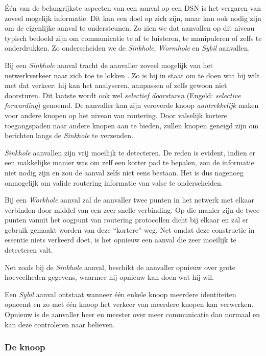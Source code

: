 \'E\'en van de belangrijkste aspecten van een aanval op een DSN is het vergaren
van zoveel mogelijk informatie. Dit kan een doel op zich zijn, maar kan ook
nodig zijn om de eigenlijke aanval te ondersteunen. Zo zien we dat aanvallen op
dit niveau typisch bedoeld zijn om communicatie te af te luisteren, te
manipuleren of zelfs te onderdrukken. Zo onderscheiden we de \emph{Sinkhole},
\emph{Wormhole} en \emph{Sybil} aanvallen.

Bij een \emph{Sinkhole} aanval tracht de aanvaller zoveel mogelijk van het
netwerkverkeer naar zich toe te lokken \citep{krontiris2008launching}. Zo is hij
in staat om te doen wat hij wilt met dat verkeer: hij kan het analyseren,
aanpassen of zelfs gewoon niet doorsturen. Dit laatste wordt ook wel
\emph{selectief doorsturen} (Engeld: \emph{selective forwarding}) genoemd. De
aanvaller kan zijn veroverde knoop \emph{aantrekkelijk} maken voor andere
knopen op het niveau van routering. Door valselijk kortere toegangspaden naar
andere knopen aan te bieden, zullen knopen geneigd zijn om berichten langs de
\emph{Sinkhole} te verzenden.

\emph{Sinkhole} aanvallen zijn vrij moeilijk te detecteren. De reden is
evident, indien er een makkelijke manier was om zelf een korter pad te bepalen,
zou de informatie niet nodig zijn en zou de aanval zelfs niet eens bestaan. Het
is dus nagenoeg onmogelijk om valide routering informatie van valse te
onderscheiden.

Bij een \emph{Workhole} aanval zal de aanvaller twee punten in het netwerk met
elkaar verbinden door middel van een zeer snelle verbinding. Op die manier zijn
de twee punten vanuit het oogpunt van routering protocollen dicht bij elkaar en
zal er gebruik gemaakt worden van deze ``kortere'' weg. Net omdat deze
constructie in essentie niets verkeerd doet, is het opnieuw een aanval die zeer
moeilijk te detecteren valt.

Net zoals bij de \emph{Sinkhole} aanval, beschikt de aanvaller opnieuw over
grote hoeveelheden gegevens, waarmee hij opnieuw kan doen wat hij wil.

Een \emph{Sybil} aanval ontstaat wanneer \'e\'en enkele knoop meerdere
identiteiten opneemt en zo met \'e\'en knoop het verkeer van meerdere knopen
kan verwerken. Opnieuw is de aanvaller heer en meester over meer communicatie
dan normaal en kan deze controleren naar believen.

\subsubsection*{De knoop}

